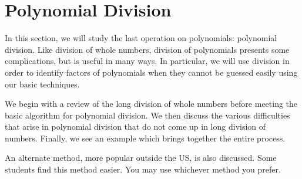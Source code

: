 \section{Polynomial Division}
In this section, we will study the last operation on polynomials: polynomial division. Like division of whole numbers, division of polynomials presents some complications, but is useful in many ways. In particular, we will use division in order to identify factors of polynomials when they cannot be guessed easily using our basic techniques.

We begin with a review of the long division of whole numbers before meeting the basic algorithm for polynomial division. We then discuss the various difficulties that arise in polynomial division that do not come up in long division of numbers. Finally, we see an example which brings together the entire process.

An alternate method, more popular outside the US, is also discussed. Some students find this method easier. You may use whichever method you prefer.








